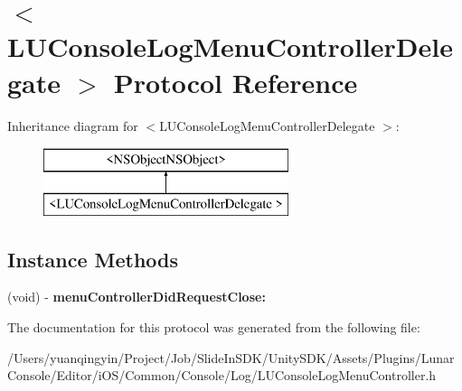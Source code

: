 \hypertarget{protocol_l_u_console_log_menu_controller_delegate_01-p}{}\section{$<$L\+U\+Console\+Log\+Menu\+Controller\+Delegate $>$ Protocol Reference}
\label{protocol_l_u_console_log_menu_controller_delegate_01-p}
Inheritance diagram for $<$L\+U\+Console\+Log\+Menu\+Controller\+Delegate $>$\+:\begin{figure}[H]
\begin{center}
\leavevmode
\includegraphics[height=2.000000cm]{protocol_l_u_console_log_menu_controller_delegate_01-p}
\end{center}
\end{figure}
\subsection*{Instance Methods}
\begin{DoxyCompactItemize}
\item 
\mbox{\label{protocol_l_u_console_log_menu_controller_delegate_01-p_a83bf5fe53175af354497db3b5ea4d045}} 
(void) -\/ {\bfseries menu\+Controller\+Did\+Request\+Close\+:}
\end{DoxyCompactItemize}


The documentation for this protocol was generated from the following file\+:\begin{DoxyCompactItemize}
\item 
/\+Users/yuanqingyin/\+Project/\+Job/\+Slide\+In\+S\+D\+K/\+Unity\+S\+D\+K/\+Assets/\+Plugins/\+Lunar\+Console/\+Editor/i\+O\+S/\+Common/\+Console/\+Log/L\+U\+Console\+Log\+Menu\+Controller.\+h\end{DoxyCompactItemize}
